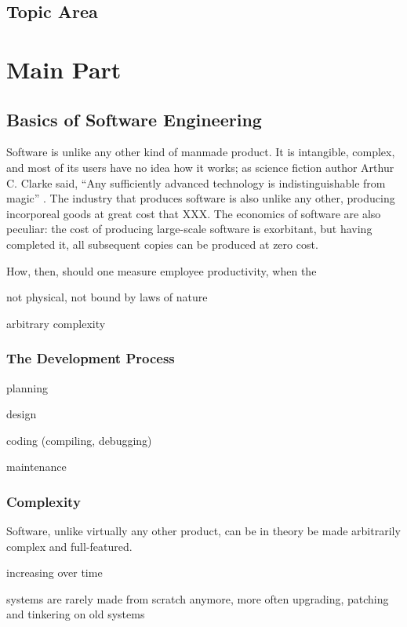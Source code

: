 \documentclass[letterpaper, 12pt]{report}
\begin{document}
\section{Topic Area}

\chapter{Main Part}
\section{Basics of Software Engineering}
Software is unlike any other kind of manmade product. 
It is intangible, complex, and most of its users have no idea how it works; as science fiction author Arthur C. Clarke said, ``Any sufficiently advanced technology is indistinguishable from magic'' \parencite{about:clarke}.
The industry that produces software is also unlike any other, producing incorporeal goods at great cost that XXX.
The economics of software are also peculiar: the cost of producing large-scale software is exorbitant, but having completed it, all subsequent copies can be produced at zero cost. 

How, then, should one measure employee productivity, when the 

not physical, not bound by laws of nature

arbitrary complexity

\subsection{The Development Process}
planning

design

coding (compiling, debugging)

maintenance

\subsection{Complexity}
Software, unlike virtually any other product, can be in theory be made arbitrarily complex and full-featured.

increasing over time

systems are rarely made from scratch anymore, more often upgrading, patching and tinkering on old systems
\end{document}
